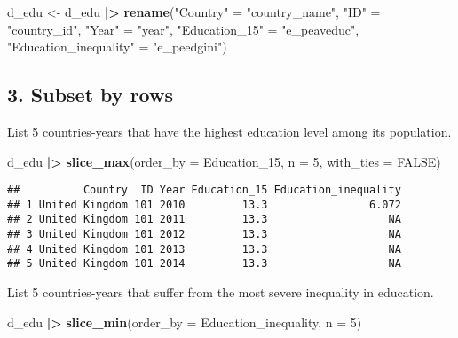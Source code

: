 \documentclass[
]{article}
\newenvironment{Shaded}{\begin{snugshade}}{\end{snugshade}}
\newcommand{\AttributeTok}[1]{\textcolor[rgb]{0.13,0.29,0.53}{#1}}
\newcommand{\ConstantTok}[1]{\textcolor[rgb]{0.56,0.35,0.01}{#1}}
\newcommand{\DecValTok}[1]{\textcolor[rgb]{0.00,0.00,0.81}{#1}}
\newcommand{\FunctionTok}[1]{\textcolor[rgb]{0.13,0.29,0.53}{\textbf{#1}}}
\newcommand{\NormalTok}[1]{#1}
\newcommand{\OtherTok}[1]{\textcolor[rgb]{0.56,0.35,0.01}{#1}}
\newcommand{\SpecialCharTok}[1]{\textcolor[rgb]{0.81,0.36,0.00}{\textbf{#1}}}
\newcommand{\StringTok}[1]{\textcolor[rgb]{0.31,0.60,0.02}{#1}}
\begin{document}
\begin{Shaded}
\begin{Highlighting}[]
\NormalTok{d\_edu }\OtherTok{\textless{}{-}}\NormalTok{ d\_edu }\SpecialCharTok{|\textgreater{}}
  \FunctionTok{rename}\NormalTok{(}\StringTok{"Country"} \OtherTok{=} \StringTok{"country\_name"}\NormalTok{, }\StringTok{"ID"} \OtherTok{=} \StringTok{"country\_id"}\NormalTok{, }
         \StringTok{"Year"} \OtherTok{=} \StringTok{"year"}\NormalTok{, }\StringTok{"Education\_15"} \OtherTok{=} \StringTok{"e\_peaveduc"}\NormalTok{,}
         \StringTok{"Education\_inequality"} \OtherTok{=} \StringTok{"e\_peedgini"}\NormalTok{)}
\end{Highlighting}
\end{Shaded}

\hypertarget{subset-by-rows}{%
\subsection{\texorpdfstring{3. \textbf{Subset by
rows}}{3. Subset by rows}}\label{subset-by-rows}}

List 5 countries-years that have the highest education level among its
population.

\begin{Shaded}
\begin{Highlighting}[]
\NormalTok{d\_edu }\SpecialCharTok{|\textgreater{}}
  \FunctionTok{slice\_max}\NormalTok{(}\AttributeTok{order\_by =}\NormalTok{ Education\_15, }\AttributeTok{n =} \DecValTok{5}\NormalTok{, }\AttributeTok{with\_ties =} \ConstantTok{FALSE}\NormalTok{)}
\end{Highlighting}
\end{Shaded}

\begin{verbatim}
##          Country  ID Year Education_15 Education_inequality
## 1 United Kingdom 101 2010         13.3                6.072
## 2 United Kingdom 101 2011         13.3                   NA
## 3 United Kingdom 101 2012         13.3                   NA
## 4 United Kingdom 101 2013         13.3                   NA
## 5 United Kingdom 101 2014         13.3                   NA
\end{verbatim}

List 5 countries-years that suffer from the most severe inequality in
education.

\begin{Shaded}
\begin{Highlighting}[]
\NormalTok{d\_edu }\SpecialCharTok{|\textgreater{}}
  \FunctionTok{slice\_min}\NormalTok{(}\AttributeTok{order\_by =}\NormalTok{ Education\_inequality, }\AttributeTok{n =} \DecValTok{5}\NormalTok{)}
\end{Highlighting}
\end{Shaded}
\end{document}
